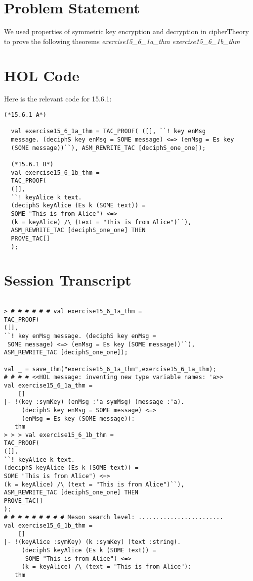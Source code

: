 \documentclass{report}
\begin{document}
\section{Problem Statement}
We used properties of symmetric key encryption and decryption in cipherTheory to prove the following theorems
\emph{exercise15_6_1a_thm}\HOLcryptoExercisesTheoremsexerciseOneFiveXXSixXXOneaXXthm
\emph{exercise15_6_1b_thm}\HOLcryptoExercisesTheoremsexerciseOneFiveXXSixXXOnebXXthm

\section{HOL Code}
\label{HOl Code 1561}
Here is the relevant code for 15.6.1:
\begin {lstlisting}[frame=trBL]
  (*15.6.1 A*)

  val exercise15_6_1a_thm = TAC_PROOF( ([], ``! key enMsg
  message. (deciphS key enMsg = SOME message) <=> (enMsg = Es key
  (SOME message))``), ASM_REWRITE_TAC [deciphS_one_one]);

  (*15.6.1 B*)
  val exercise15_6_1b_thm =
  TAC_PROOF(
  ([],
  ``! keyAlice k text.
  (deciphS keyAlice (Es k (SOME text)) =
  SOME "This is from Alice") <=>
  (k = keyAlice) /\ (text = "This is from Alice")``),
  ASM_REWRITE_TAC [deciphS_one_one] THEN
  PROVE_TAC[]
  );
\end{lstlisting}

\section{Session Transcript}
\label{Session Trans1561}

\setcounter{sessioncount}{0}
\begin{session}
  \begin{scriptsize}
\begin{verbatim}

> # # # # # # val exercise15_6_1a_thm =
TAC_PROOF(
([],
``! key enMsg message. (deciphS key enMsg =
 SOME message) <=> (enMsg = Es key (SOME message))``),
ASM_REWRITE_TAC [deciphS_one_one]);

val _ = save_thm("exercise15_6_1a_thm",exercise15_6_1a_thm);
# # # # <<HOL message: inventing new type variable names: 'a>>
val exercise15_6_1a_thm =
    []
|- !(key :symKey) (enMsg :'a symMsg) (message :'a).
     (deciphS key enMsg = SOME message) <=>
     (enMsg = Es key (SOME message)):
   thm
> > > val exercise15_6_1b_thm =
TAC_PROOF(
([],
``! keyAlice k text.
(deciphS keyAlice (Es k (SOME text)) =
SOME "This is from Alice") <=>
(k = keyAlice) /\ (text = "This is from Alice")``),
ASM_REWRITE_TAC [deciphS_one_one] THEN
PROVE_TAC[]
);
# # # # # # # # # Meson search level: ........................
val exercise15_6_1b_thm =
    []
|- !(keyAlice :symKey) (k :symKey) (text :string).
     (deciphS keyAlice (Es k (SOME text)) =
      SOME "This is from Alice") <=>
     (k = keyAlice) /\ (text = "This is from Alice"):
   thm
\end{verbatim}
  \end{scriptsize}
\end{session}
\end{document}
